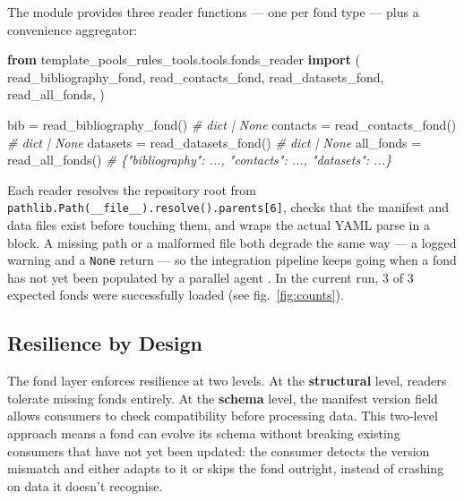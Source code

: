 \documentclass[
]{article}
\newenvironment{Shaded}{}{}
\newcommand{\CommentTok}[1]{\textcolor[rgb]{0.38,0.63,0.69}{\textit{#1}}}
\newcommand{\ImportTok}[1]{\textcolor[rgb]{0.00,0.50,0.00}{\textbf{#1}}}
\newcommand{\NormalTok}[1]{#1}
\newcommand{\OperatorTok}[1]{\textcolor[rgb]{0.40,0.40,0.40}{#1}}
\begin{document}
The 
module provides three reader functions --- one per fond type --- plus a
convenience aggregator:

\begin{Shaded}
\begin{Highlighting}[]
\ImportTok{from}\NormalTok{ template\_pools\_rules\_tools.tools.fonds\_reader }\ImportTok{import}\NormalTok{ (}
\NormalTok{    read\_bibliography\_fond,}
\NormalTok{    read\_contacts\_fond,}
\NormalTok{    read\_datasets\_fond,}
\NormalTok{    read\_all\_fonds,}
\NormalTok{)}

\NormalTok{bib      }\OperatorTok{=}\NormalTok{ read\_bibliography\_fond()   }\CommentTok{\# dict | None}
\NormalTok{contacts }\OperatorTok{=}\NormalTok{ read\_contacts\_fond()       }\CommentTok{\# dict | None}
\NormalTok{datasets }\OperatorTok{=}\NormalTok{ read\_datasets\_fond()       }\CommentTok{\# dict | None}
\NormalTok{all\_fonds }\OperatorTok{=}\NormalTok{ read\_all\_fonds()          }\CommentTok{\# \{"bibliography": ..., "contacts": ..., "datasets": ...\}}
\end{Highlighting}
\end{Shaded}

Each reader resolves the repository root from
\texttt{pathlib.Path(\_\_file\_\_).resolve().parents{[}6{]}}, checks
that the manifest and data files exist before touching them, and wraps
the actual YAML parse in a
block. A missing path or a malformed file both degrade the same way ---
a logged warning and a \texttt{None} return --- so the integration
pipeline keeps going when a fond has not yet been populated by a
parallel agent \citep{Taschuk2017ten}. In the current run, 3 of 3
expected fonds were successfully loaded (see fig.~\ref{fig:counts}).

\subsection{Resilience by Design}\label{resilience-by-design}

The fond layer enforces resilience at two levels. At the
\textbf{structural} level, readers tolerate missing fonds entirely. At
the \textbf{schema} level, the manifest version field allows consumers
to check compatibility before processing data. This two-level approach
means a fond can evolve its schema without breaking existing consumers
that have not yet been updated: the consumer detects the version
mismatch and either adapts to it or skips the fond outright, instead of
crashing on data it doesn't recognise.
\end{document}
